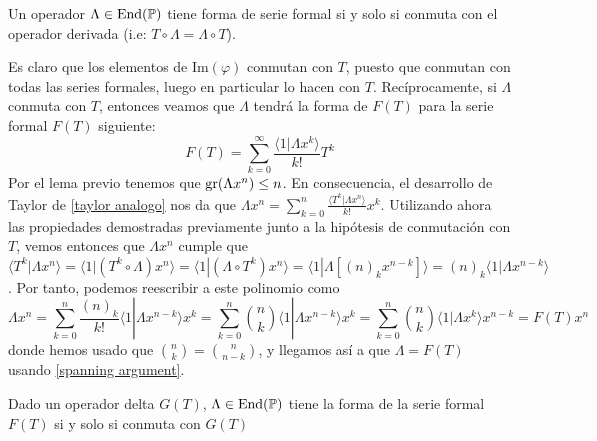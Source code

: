 \begin{teorema}
    Un operador $\Lambda \in \operatorname*{End}(\mathbb{P})$ tiene forma de serie formal si y solo si conmuta con el operador derivada (i.e: $T \circ \Lambda = \Lambda \circ T$).
\end{teorema}

\begin{demo}
    Es claro que los elementos de $\text{Im}(\varphi)$ conmutan con $T$, puesto que conmutan con todas las series formales, luego en particular lo hacen con $T$. Recíprocamente, si $\Lambda$ conmuta con $T$, entonces veamos que $\Lambda$ tendrá la forma de $F(T)$ para la serie formal $F(T)$ siguiente:
    \begin{equation*}
        F(T) = \sum_{k=0}^\infty \frac{\langle 1| \Lambda x^k\rangle}{k!}T^k
    \end{equation*}
    Por el lema previo tenemos que $\operatorname{gr}(\Lambda x^n) \leq n$. En consecuencia, el desarrollo de Taylor de \ref{taylor analogo} nos da que $\Lambda x^n = \sum_{k=0}^n \frac{\langle T^k| \Lambda x^n\rangle}{k!}x^k$. Utilizando ahora las propiedades demostradas previamente junto a la hipótesis de conmutación con $T$, vemos entonces que $\Lambda x^n$ cumple que $\langle T^k| \Lambda x^n\rangle = \langle 1| (T^k \circ \Lambda) x^n\rangle = \langle 1| (\Lambda \circ T^k) x^n\rangle = \langle 1| \Lambda [(n)_k x^{n-k}]\rangle = (n)_k \langle 1| \Lambda x^{n-k}\rangle$. Por tanto, podemos reescribir a este polinomio como
    \begin{equation*}
        \Lambda x^n = \sum_{k=0}^n \frac{(n)_k}{k!}\langle 1| \Lambda x^{n-k}\rangle x^k = \sum_{k=0}^n \binom{n}{k}\langle 1| \Lambda x^{n-k}\rangle x^k = \sum_{k=0}^n \binom{n}{k}\langle 1| \Lambda x^{k}\rangle x^{n-k} = F(T)x^n 
    \end{equation*}
    donde hemos usado que $\binom{n}{k} = \binom{n}{n-k}$, y llegamos así a que $\Lambda = F(T)$ usando \ref{spanning argument}.
\end{demo}

\begin{corolario}\label{conmutacion G(T)}
    Dado un operador delta $G(T)$, $\Lambda \in \operatorname*{End}(\mathbb{P})$ tiene la forma de la serie formal $F(T)$ si y solo si conmuta con $G(T)$
\end{corolario}

